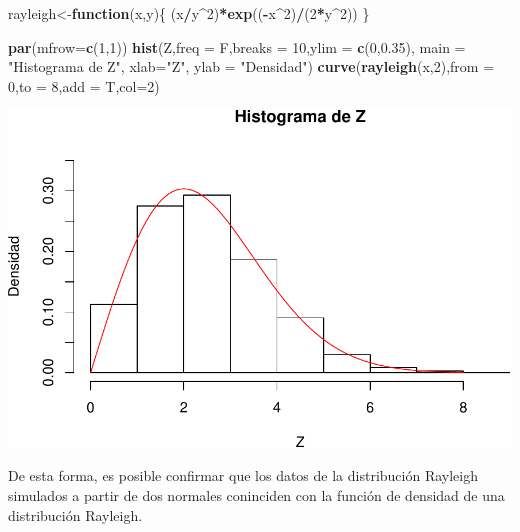 \documentclass[]{article}
\newenvironment{Shaded}{\begin{snugshade}}{\end{snugshade}}
\newcommand{\KeywordTok}[1]{\textcolor[rgb]{0.13,0.29,0.53}{\textbf{#1}}}
\newcommand{\DataTypeTok}[1]{\textcolor[rgb]{0.13,0.29,0.53}{#1}}
\newcommand{\DecValTok}[1]{\textcolor[rgb]{0.00,0.00,0.81}{#1}}
\newcommand{\FloatTok}[1]{\textcolor[rgb]{0.00,0.00,0.81}{#1}}
\newcommand{\StringTok}[1]{\textcolor[rgb]{0.31,0.60,0.02}{#1}}
\newcommand{\ControlFlowTok}[1]{\textcolor[rgb]{0.13,0.29,0.53}{\textbf{#1}}}
\newcommand{\OperatorTok}[1]{\textcolor[rgb]{0.81,0.36,0.00}{\textbf{#1}}}
\newcommand{\NormalTok}[1]{#1}
\begin{document}
\begin{Shaded}
\begin{Highlighting}[]
\NormalTok{rayleigh<-}\ControlFlowTok{function}\NormalTok{(x,y)\{}
\NormalTok{  (x}\OperatorTok{/}\NormalTok{y}\OperatorTok{^}\DecValTok{2}\NormalTok{)}\OperatorTok{*}\KeywordTok{exp}\NormalTok{((}\OperatorTok{-}\NormalTok{x}\OperatorTok{^}\DecValTok{2}\NormalTok{)}\OperatorTok{/}\NormalTok{(}\DecValTok{2}\OperatorTok{*}\NormalTok{y}\OperatorTok{^}\DecValTok{2}\NormalTok{))}
\NormalTok{\}}

\KeywordTok{par}\NormalTok{(}\DataTypeTok{mfrow=}\KeywordTok{c}\NormalTok{(}\DecValTok{1}\NormalTok{,}\DecValTok{1}\NormalTok{))}
\KeywordTok{hist}\NormalTok{(Z,}\DataTypeTok{freq =}\NormalTok{ F,}\DataTypeTok{breaks =} \DecValTok{10}\NormalTok{,}\DataTypeTok{ylim =} \KeywordTok{c}\NormalTok{(}\DecValTok{0}\NormalTok{,}\FloatTok{0.35}\NormalTok{), }\DataTypeTok{main =} \StringTok{"Histograma de Z"}\NormalTok{, }\DataTypeTok{xlab=}\StringTok{"Z"}\NormalTok{, }\DataTypeTok{ylab =} \StringTok{"Densidad"}\NormalTok{)}
\KeywordTok{curve}\NormalTok{(}\KeywordTok{rayleigh}\NormalTok{(x,}\DecValTok{2}\NormalTok{),}\DataTypeTok{from =} \DecValTok{0}\NormalTok{,}\DataTypeTok{to =} \DecValTok{8}\NormalTok{,}\DataTypeTok{add =}\NormalTok{ T,}\DataTypeTok{col=}\DecValTok{2}\NormalTok{)}
\end{Highlighting}
\end{Shaded}

\includegraphics{notebook_simulaciones_files/figure-latex/unnamed-chunk-5-1.pdf}

De esta forma, es posible confirmar que los datos de la distribución
Rayleigh simulados a partir de dos normales coninciden con la función de
densidad de una distribución Rayleigh.
\end{document}
